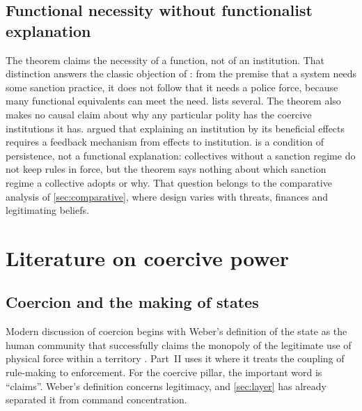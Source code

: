 \documentclass[11pt,letterpaper]{article}
\theoremstyle{definition}
\theoremstyle{remark}
\begin{document}
\subsection{Functional necessity without functionalist explanation}

The theorem claims the necessity of a function, not of an institution. That distinction answers the classic objection of \citet{hempel1959}: from the premise that a system needs some sanction practice, it does not follow that it needs a police force, because many functional equivalents can meet the need.  lists several. The theorem also makes no causal claim about why any particular polity has the coercive institutions it has. \citet{elster1979,elster1983} argued that explaining an institution by its beneficial effects requires a feedback mechanism from effects to institution.  is a condition of persistence, not a functional explanation: collectives without a sanction regime do not keep rules in force, but the theorem says nothing about which sanction regime a collective adopts or why. That question belongs to the comparative analysis of \cref{sec:comparative}, where design varies with threats, finances and legitimating beliefs.

\section{Literature on coercive power}
\label{sec:literature}

\subsection{Coercion and the making of states}

Modern discussion of coercion begins with Weber's definition of the state as the human community that successfully claims the monopoly of the legitimate use of physical force within a territory \citep{weber1946,weber1978}. Part~II uses it where it treats the coupling of rule-making to enforcement. For the coercive pillar, the important word is ``claims''. Weber's definition concerns legitimacy, and \cref{sec:layer} has already separated it from command concentration.
\end{document}

